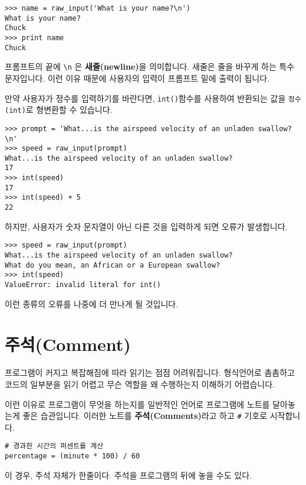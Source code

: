 \beforeverb
\begin{verbatim}
>>> name = raw_input('What is your name?\n')
What is your name?
Chuck
>>> print name
Chuck
\end{verbatim}
\afterverb
%

프롬프트의 끝에 \verb"\n" 은 {\bf 새줄(newline)}을 의미합니다. 새줄은 줄을 바꾸게 하는 특수 문자입니다. 이런 이유 때문에 사용자의 입력이 프롬프트 밑에 출력이 됩니다.


만약 사용자가 정수를 입력하기를 바란다면, {\tt int()}함수를 사용하여 반환되는 값을 {\tt 정수(int)}로 형변환할 수 있습니다.

\beforeverb
\begin{verbatim}
>>> prompt = 'What...is the airspeed velocity of an unladen swallow?\n'
>>> speed = raw_input(prompt)
What...is the airspeed velocity of an unladen swallow?
17
>>> int(speed)
17
>>> int(speed) + 5
22
\end{verbatim}
\afterverb
%
하지만, 사용자가 숫자 문자열이 아닌 다른 것을 입력하게 되면 오류가 발생합니다.

\beforeverb
\begin{verbatim}
>>> speed = raw_input(prompt)
What...is the airspeed velocity of an unladen swallow?
What do you mean, an African or a European swallow?
>>> int(speed)
ValueError: invalid literal for int()
\end{verbatim}
\afterverb
%

이런 종류의 오류를 나중에 더 만나게 될 것입니다.



\section{주석(Comment)}

프로그램이 커지고 복잡해짐에 따라 읽기는 점점 어려워집니다. 형식언어로 촘촘하고 코드의 일부분을 읽기 어렵고 무슨 역할을 왜 수행하는지 이해하기 어렵습니다.

이런 이유로 프로그램이 무엇을 하는지를 일반적인 언어로 프로그램에 노트를 달아놓는게 좋은 습관입니다. 이러한 노트를 {\bf 주석(Comments)}라고 하고 \verb"#" 기호로 시작합니다.


\beforeverb
\begin{verbatim}
# 경과한 시간의 퍼센트를 계산
percentage = (minute * 100) / 60
\end{verbatim}
\afterverb
%
이 경우, 주석 자체가 한줄이다. 주석을 프로그램의 뒤에 놓을 수도 있다.

